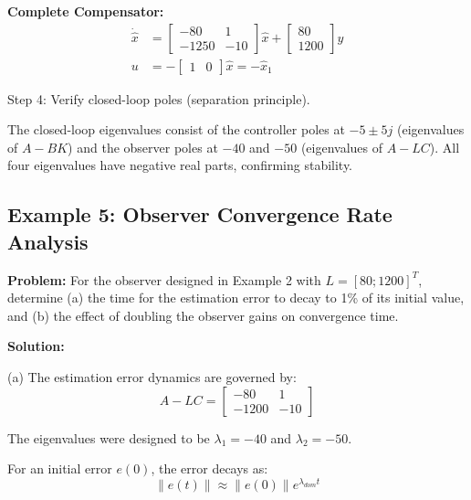 \textbf{Complete Compensator:}
\begin{equation}
\boxed{
\begin{aligned}
\dot{\hat{x}} &= \begin{bmatrix} -80 & 1 \\ -1250 & -10 \end{bmatrix} \hat{x} + \begin{bmatrix} 80 \\ 1200 \end{bmatrix} y \\
u &= -\begin{bmatrix} 1 & 0 \end{bmatrix} \hat{x} = -\hat{x}_1
\end{aligned}
}
\end{equation}

Step 4: Verify closed-loop poles (separation principle).

The closed-loop eigenvalues consist of the controller poles at $-5 \pm 5j$ (eigenvalues of $A - BK$) and the observer poles at $-40$ and $-50$ (eigenvalues of $A - LC$). All four eigenvalues have negative real parts, confirming stability.

\hrulefill

\subsection{Example 5: Observer Convergence Rate Analysis}

\textbf{Problem:} For the observer designed in Example 2 with $L = [80; 1200]^T$, determine (a) the time for the estimation error to decay to 1\% of its initial value, and (b) the effect of doubling the observer gains on convergence time.

\textbf{Solution:}

(a) The estimation error dynamics are governed by:
\begin{equation}
A - LC = \begin{bmatrix} -80 & 1 \\ -1200 & -10 \end{bmatrix}
\end{equation}

The eigenvalues were designed to be $\lambda_1 = -40$ and $\lambda_2 = -50$.

For an initial error $e(0)$, the error decays as:
\begin{equation}
\|e(t)\| \approx \|e(0)\| e^{\lambda_{dom} t}
\end{equation}

